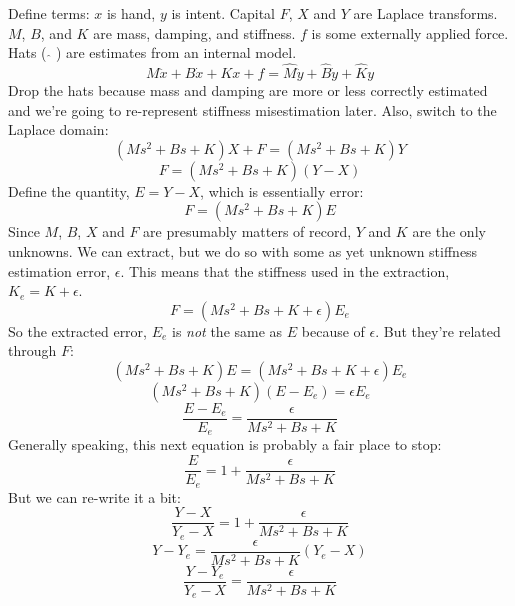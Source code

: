 \documentclass[10pt]{article}
\begin{document}
Define terms: $x$ is hand, $y$ is intent. Capital $F$, $X$ and $Y$ are Laplace transforms. $M$, $B$, and $K$ are mass, damping, and stiffness. $f$ is some externally applied force. Hats ( $\hat{ }$ ) are estimates from an internal model.
\begin{equation}
M\ddot{x}+B\dot{x}+Kx+f=\hat{M}\ddot{y}+\hat{B}\dot{y}+\hat{K}y
\end{equation}
Drop the hats because mass and damping are more or less correctly estimated and we're going to re-represent stiffness misestimation later. Also, switch to the Laplace domain:
\begin{equation}
(Ms^2+Bs+K)X+F=(Ms^2+Bs+K)Y
\end{equation}  
\begin{equation}
F=(Ms^2+Bs+K)(Y-X)
\end{equation}  
Define the quantity, $E=Y-X$, which is essentially error:
\begin{equation}
F=(Ms^2+Bs+K)E
\end{equation} 
Since $M$, $B$, $X$ and $F$ are presumably matters of record, $Y$ and $K$ are the only unknowns. We can extract, but we do so with some as yet unknown stiffness estimation error, $\epsilon$. This means that the stiffness used in the extraction, $K_e=K+\epsilon$.
\begin{equation}
F=(Ms^2+Bs+K+\epsilon)E_e
\end{equation}
So the extracted error, $E_e$ is \textit{not} the same as $E$ because of $\epsilon$. But they're related through $F$:
\begin{equation}
(Ms^2+Bs+K)E=(Ms^2+Bs+K+\epsilon)E_e
\end{equation} 
\begin{equation}
(Ms^2+Bs+K)(E-E_e)=\epsilon E_e
\end{equation} 
\begin{equation}
\frac{E-E_e}{E_e}=\frac{\epsilon}{Ms^2+Bs+K}
\end{equation} 
Generally speaking, this next equation is probably a fair place to stop:
\begin{equation}
\frac{E}{E_e}=1+\frac{\epsilon}{Ms^2+Bs+K}
\end{equation}
But we can re-write it a bit:
\begin{equation}
\frac{Y-X}{Y_e-X}=1+\frac{\epsilon}{Ms^2+Bs+K}
\end{equation} 
\begin{equation}
Y-Y_e=\frac{\epsilon}{Ms^2+Bs+K}(Y_e-X)
\end{equation}
\begin{equation}
\frac{Y-Y_e}{Y_e-X}=\frac{\epsilon}{Ms^2+Bs+K}
\end{equation}
\end{document}
